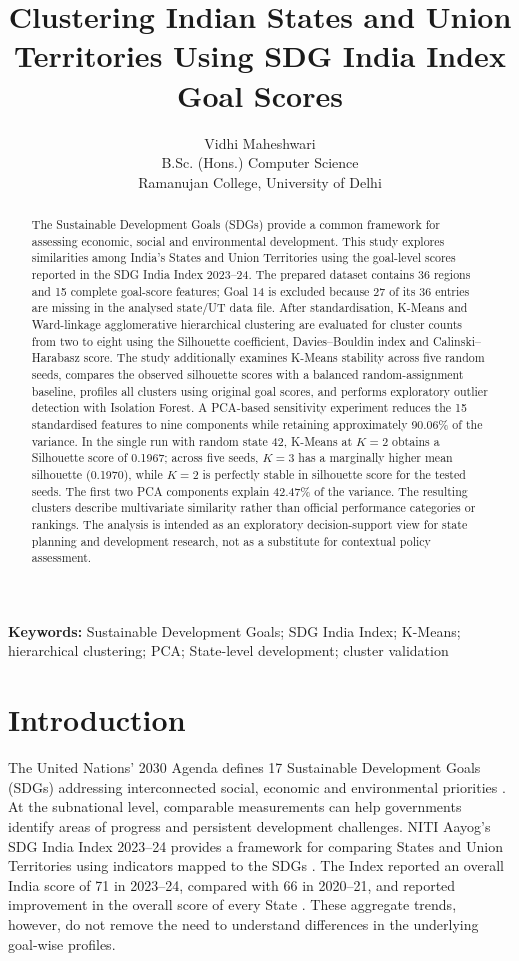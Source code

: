 \documentclass[11pt,a4paper]{article}
\title{\textbf{Clustering Indian States and Union Territories Using SDG India Index Goal Scores}}
\author{Vidhi Maheshwari\\
B.Sc. (Hons.) Computer Science\\
Ramanujan College, University of Delhi}
\date{}
\begin{document}
\maketitle

\begin{abstract}
The Sustainable Development Goals (SDGs) provide a common framework for assessing economic, social and environmental development. This study explores similarities among India's States and Union Territories using the goal-level scores reported in the SDG India Index 2023--24. The prepared dataset contains 36 regions and 15 complete goal-score features; Goal 14 is excluded because 27 of its 36 entries are missing in the analysed state/UT data file. After standardisation, K-Means and Ward-linkage agglomerative hierarchical clustering are evaluated for cluster counts from two to eight using the Silhouette coefficient, Davies--Bouldin index and Calinski--Harabasz score. The study additionally examines K-Means stability across five random seeds, compares the observed silhouette scores with a balanced random-assignment baseline, profiles all clusters using original goal scores, and performs exploratory outlier detection with Isolation Forest. A PCA-based sensitivity experiment reduces the 15 standardised features to nine components while retaining approximately 90.06\% of the variance. In the single run with random state 42, K-Means at $K=2$ obtains a Silhouette score of 0.1967; across five seeds, $K=3$ has a marginally higher mean silhouette (0.1970), while $K=2$ is perfectly stable in silhouette score for the tested seeds. The first two PCA components explain 42.47\% of the variance. The resulting clusters describe multivariate similarity rather than official performance categories or rankings. The analysis is intended as an exploratory decision-support view for state planning and development research, not as a substitute for contextual policy assessment.
\end{abstract}

\textbf{Keywords:} Sustainable Development Goals; SDG India Index; K-Means; hierarchical clustering; PCA; State-level development; cluster validation

\section{Introduction}
The United Nations' 2030 Agenda defines 17 Sustainable Development Goals (SDGs) addressing interconnected social, economic and environmental priorities \cite{un2030}. At the subnational level, comparable measurements can help governments identify areas of progress and persistent development challenges. NITI Aayog's SDG India Index 2023--24 provides a framework for comparing States and Union Territories using indicators mapped to the SDGs \cite{niti2024}. The Index reported an overall India score of 71 in 2023--24, compared with 66 in 2020--21, and reported improvement in the overall score of every State \cite{pib2024}. These aggregate trends, however, do not remove the need to understand differences in the underlying goal-wise profiles.
\end{document}
